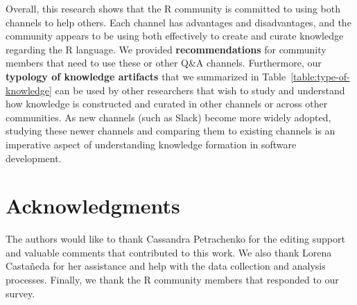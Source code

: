 \documentclass[smallextended]{svjour3}       %
\begin{document}
Overall, this research shows that the R community is committed to using both channels to help others. Each channel has advantages and disadvantages, and the
community appears to be using both effectively to create and curate knowledge regarding the R language.  We provided \textbf{recommendations} for community members that need to use these or other Q\&A channels.  Furthermore, our \textbf{typology of knowledge artifacts} that we summarized in Table~\ref{table:type-of-knowledge} can be used by other researchers that wish to study and understand how knowledge is constructed and curated in other channels or across other communities.  As new channels (such as Slack) become more widely adopted, studying these newer channels and comparing them to existing channels is an imperative aspect of understanding knowledge formation in software development. 












 
\section{Acknowledgments}
The authors would like to thank Cassandra Petrachenko for the editing support and valuable comments that contributed to this work. We also thank Lorena Castañeda for her assistance and help with the data collection and analysis processes.  Finally, we thank the R community members that responded to our survey.



\end{document}
